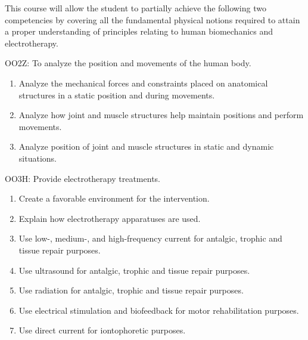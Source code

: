{This course will allow the student to partially achieve the following two competencies by covering all the fundamental physical notions required to attain a proper understanding of principles relating to human biomechanics and electrotherapy.

OO2Z:  To analyze the position and movements of the human body.
\begin{enumerate}
\item Analyze the mechanical forces and constraints placed on anatomical structures in a static position and during movements.
\item Analyze how joint and muscle structures help maintain positions and perform movements.
\item Analyze position of joint and muscle structures in static and dynamic situations.
\end{enumerate}
\smallskip

OO3H:	Provide electrotherapy treatments.
\begin{enumerate}
\item Create a favorable environment for the intervention.
\item Explain how electrotherapy apparatuses are used.
\item Use low-, medium-, and high-frequency current for antalgic, trophic and tissue repair purposes.
\item Use ultrasound for antalgic, trophic and tissue repair purposes.
\item Use radiation for antalgic, trophic and tissue repair purposes.
\item Use electrical stimulation and biofeedback for motor rehabilitation purposes.
\item Use direct current for iontophoretic purposes.
\end{enumerate}
}
